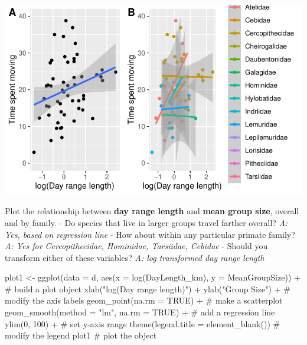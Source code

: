 \documentclass[
  letterpaper,
  DIV=11,
  numbers=noendperiod]{scrartcl}
\newenvironment{Shaded}{\begin{snugshade}}{\end{snugshade}}
\newcommand{\AttributeTok}[1]{\textcolor[rgb]{0.40,0.45,0.13}{#1}}
\newcommand{\CommentTok}[1]{\textcolor[rgb]{0.37,0.37,0.37}{#1}}
\newcommand{\ConstantTok}[1]{\textcolor[rgb]{0.56,0.35,0.01}{#1}}
\newcommand{\DecValTok}[1]{\textcolor[rgb]{0.68,0.00,0.00}{#1}}
\newcommand{\FunctionTok}[1]{\textcolor[rgb]{0.28,0.35,0.67}{#1}}
\newcommand{\NormalTok}[1]{\textcolor[rgb]{0.00,0.23,0.31}{#1}}
\newcommand{\OtherTok}[1]{\textcolor[rgb]{0.00,0.23,0.31}{#1}}
\newcommand{\SpecialCharTok}[1]{\textcolor[rgb]{0.37,0.37,0.37}{#1}}
\newcommand{\StringTok}[1]{\textcolor[rgb]{0.13,0.47,0.30}{#1}}
\begin{document}
\includegraphics{EDA-challenge_files/figure-pdf/unnamed-chunk-3-3.pdf}

Plot the relationship between \textbf{day range length} and \textbf{mean
group size}, overall and by family. - Do species that live in larger
groups travel farther overall? \emph{A: Yes, based on regression line} -
How about within any particular primate family? \emph{A: Yes for
Cercopithecidae, Hominidae, Tarsiidae, Cebidae} - Should you transform
either of these variables? \emph{A: log transformed day range length}

\begin{Shaded}
\begin{Highlighting}[]
\NormalTok{plot1 }\OtherTok{\textless{}{-}} \FunctionTok{ggplot}\NormalTok{(}\AttributeTok{data =}\NormalTok{ d, }
            \FunctionTok{aes}\NormalTok{(}\AttributeTok{x =} \FunctionTok{log}\NormalTok{(DayLength\_km), }
                \AttributeTok{y =}\NormalTok{ MeanGroupSize)) }\SpecialCharTok{+}  \CommentTok{\# build a plot object}
  \FunctionTok{xlab}\NormalTok{(}\StringTok{"log(Day range length)"}\NormalTok{) }\SpecialCharTok{+} \FunctionTok{ylab}\NormalTok{(}\StringTok{"Group Size"}\NormalTok{) }\SpecialCharTok{+} \CommentTok{\# modify the axis labels}
  \FunctionTok{geom\_point}\NormalTok{(}\AttributeTok{na.rm =} \ConstantTok{TRUE}\NormalTok{) }\SpecialCharTok{+} \CommentTok{\# make a scatterplot}
  \FunctionTok{geom\_smooth}\NormalTok{(}\AttributeTok{method =} \StringTok{"lm"}\NormalTok{, }\AttributeTok{na.rm =} \ConstantTok{TRUE}\NormalTok{) }\SpecialCharTok{+} \CommentTok{\# add a regression line}
  \FunctionTok{ylim}\NormalTok{(}\DecValTok{0}\NormalTok{, }\DecValTok{100}\NormalTok{) }\SpecialCharTok{+} \CommentTok{\# set y{-}axis range}
  \FunctionTok{theme}\NormalTok{(}\AttributeTok{legend.title =} \FunctionTok{element\_blank}\NormalTok{()) }\CommentTok{\# modify the legend}
\NormalTok{plot1 }\CommentTok{\# plot the object}
\end{Highlighting}
\end{Shaded}
\end{document}
